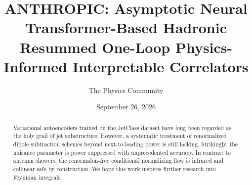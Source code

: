 \documentclass[11pt]{article}
\title{ANTHROPIC: Asymptotic Neural Transformer-Based Hadronic Resummed One-Loop Physics-Informed Interpretable Correlators}
\author{The Physics Community}
\date{September 26, 2026}
\numberwithin{equation}{section}
\theoremstyle{definition}
\theoremstyle{remark}
\begin{document}
\maketitle
\begin{abstract}
Variational autoencoders trained on the JetClass dataset have long been
regarded as the holy grail of jet substructure. However, a systematic
treatment of renormalized dipole subtraction schemes beyond
next-to-leading power is still lacking. Strikingly, the nuisance
parameter is power suppressed with unprecedented accuracy. In contrast
to antenna showers, the renormalon-free conditional normalizing flow is
infrared and collinear safe by construction. We hope this work inspires
further research into Feynman integrals.
\end{abstract}
\tableofcontents



\nocite{*}


\end{document}
